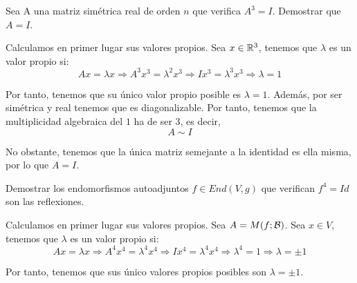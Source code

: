 \begin{ejercicio}
    Sea A una matriz simétrica real de orden $n$ que verifica $A^3 = I$. Demostrar que $A = I$.

    Calculamos en primer lugar sus valores propios. Sea $x\in \mathbb{R}^3$, tenemos que $\lambda$ es un valor propio si:
    \begin{equation*}
        Ax = \lambda x\Longrightarrow A^3x^3 = \lambda^2x^3 \Longrightarrow Ix^3 = \lambda^3 x^3 \Longrightarrow \lambda=1
    \end{equation*}

    Por tanto, tenemos que su único valor propio posible es $\lambda=1$. Además, por ser simétrica y real tenemos que es diagonalizable. Por tanto, tenemos que la multiplicidad algebraica del $1$ ha de ser 3, es decir,
    \begin{equation*}
        A\sim I
    \end{equation*}

    No obstante, tenemos que la única matriz semejante a la identidad es ella misma, por lo que $A=I$.
\end{ejercicio}

\begin{ejercicio}
    Demostrar los endomorfismos autoadjuntos $f\in End(V,g)$ que verifican $f^4 = Id$ son las reflexiones.

    Calculamos en primer lugar sus valores propios. Sea $A=M(f;\mathcal{B})$. Sea $x\in V$, tenemos que $\lambda$ es un valor propio si:
    \begin{equation*}
        Ax = \lambda x\Longrightarrow A^4x^4 = \lambda^4x^4 \Longrightarrow Ix^4 = \lambda^4 x^4 \Longrightarrow \lambda^4=1 \Longrightarrow \lambda = \pm 1
    \end{equation*}

    Por tanto, tenemos que sus único valores propios posibles son $\lambda=\pm 1$.
    
\end{ejercicio}


